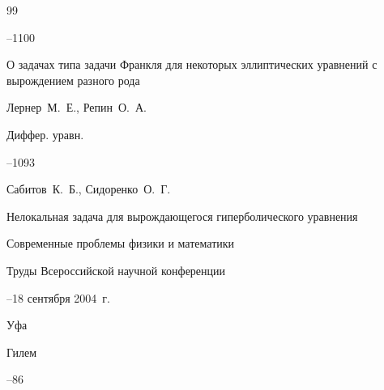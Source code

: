\begin{thebibliography}{99}


--1100










\paper О задачах типа задачи Франкля для некоторых эллиптических уравнений с вырождением разного рода

\by Лернер~М.~Е., Репин~О.~А.

\jour Диффер. уравн.




--1093










\by Сабитов~К.~Б., Сидоренко~О.~Г.

\paper Нелокальная задача для вырождающегося гиперболического уравнения

\inbook Современные проблемы физики и математики


\bookinfo Труды Всероссийской научной конференции 

--18 сентября 2004~г.

\publaddr Уфа

\publ Гилем


--86






\end{thebibliography}
